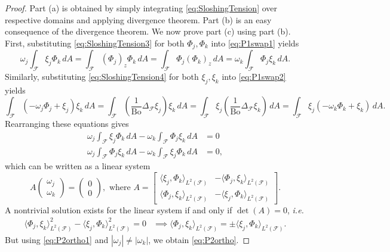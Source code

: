 \documentclass[letterpaper, 12pt]{amsart}
\newcommand{\bond}{\mathrm{Bo}}
\newcommand{\F}{\mathcal{F}}
\begin{document}
\begin{proof}
Part (a) is obtained by simply integrating \eqref{eq:SloshingTension} over respective domains and applying divergence theorem. Part (b) is an easy consequence of the divergence theorem. We now prove part (c) using part (b). First, substituting \eqref{eq:SloshingTension3} for both $\Phi_j, \Phi_k$ into \eqref{eq:P1swap1} yields
\[ \omega_j\int_\F\xi_j\Phi_k\, dA = \int_\F(\Phi_j)_z\Phi_k\, dA = \int_\F\Phi_j(\Phi_k)_z\, dA= \omega_k\int_\F\Phi_j\xi_k\, dA. \]
Similarly, substituting \eqref{eq:SloshingTension4} for both $\xi_j,\xi_k$ into \eqref{eq:P1swap2} yields 
\[ \int_\F(-\omega_j\Phi_j + \xi_j)\xi_k\, dA = \int_\F\left(\frac{1}{\bond}\Delta_\F\xi_j\right)\xi_k\, dA = \int_\F\xi_j\left(\frac{1}{\bond}\Delta_\F\xi_k\right)\, dA = \int_\F\xi_j(-\omega_k\Phi_k + \xi_k)\, dA. \]
Rearranging these equations gives
\begin{subequations}
\begin{align}
\label{eq:P2ortho1} \omega_j\int_\F\xi_j\Phi_k\, dA - \omega_k\int_\F\Phi_j\xi_k\, dA & = 0 \\
\omega_j\int_\F\Phi_j\xi_k\, dA - \omega_k\int_\F\xi_j\Phi_k\, dA & = 0, 
\end{align}
\end{subequations}
which can be written as a linear system
\[ A\begin{pmatrix} \omega_j \\ \omega_k \end{pmatrix} =  \begin{pmatrix} 0 \\ 0 \end{pmatrix}, \textrm{ where } 
A = \begin{bmatrix} \langle\xi_j, \Phi_k\rangle_{L^2(\F)} & -\langle\Phi_j, \xi_k\rangle_{L^2(\F)} \\ \langle\Phi_j, \xi_k\rangle_{L^2(\F)} & -\langle\xi_j, \Phi_k\rangle_{L^2(\F)} \end{bmatrix}. \]
A nontrivial solution exists for the linear system if and only if $\det(A)= 0$, {\it i.e.}
\begin{align*}
\langle\Phi_j, \xi_k\rangle_{L^2(\F)}^2 - \langle\xi_j, \Phi_k\rangle_{L^2(\F)}^2 = 0 & \implies \langle\Phi_j, \xi_k\rangle_{L^2(\F)} = \pm \langle\xi_j, \Phi_k\rangle_{L^2(\F)}. 
\end{align*}
But using \eqref{eq:P2ortho1} and  $|\omega_j|\neq |\omega_k|$, we obtain \eqref{eq:P2ortho}.
\end{proof}


\end{document}
